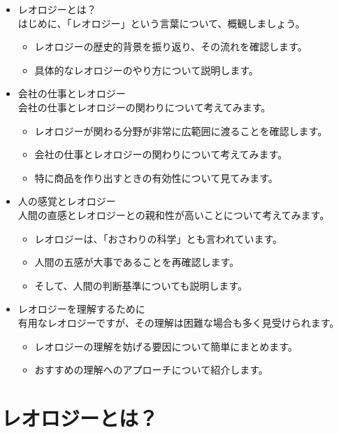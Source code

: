 \documentclass[uplatex,dvipdfmx,a4paper,11pt]{jsreport}
\begin{document}
\begin{boxnote}
	\large
	\begin{itemize}
		\item レオロジーとは？\\はじめに、「レオロジー」という言葉について、概観しましょう。
		\begin{itemize}
			\item レオロジーの歴史的背景を振り返り、その流れを確認します。
			\item 具体的なレオロジーのやり方について説明します。
		\end{itemize} 
		\item 会社の仕事とレオロジー\\会社の仕事とレオロジーの関わりについて考えてみます。
		\begin{itemize}
			\item レオロジーが関わる分野が非常に広範囲に渡ることを確認します。
			\item 会社の仕事とレオロジーの関わりについて考えてみます。
			\item 特に商品を作り出すときの有効性について見てみます。
		\end{itemize} 
		\item 人の感覚とレオロジー\\人間の直感とレオロジーとの親和性が高いことについて考えてみます。
		\begin{itemize}
			\item レオロジーは、「おさわりの科学」とも言われています。
			\item 人間の五感が大事であることを再確認します。
			\item そして、人間の判断基準についても説明します。
		\end{itemize}
		\item レオロジーを理解するために\\有用なレオロジーですが、その理解は困難な場合も多く見受けられます。
		\begin{itemize}
			\item レオロジーの理解を妨げる要因について簡単にまとめます。
			\item おすすめの理解へのアプローチについて紹介します。
		\end{itemize} 
	\end{itemize}
\end{boxnote}

\section{レオロジーとは？}
\end{document}
